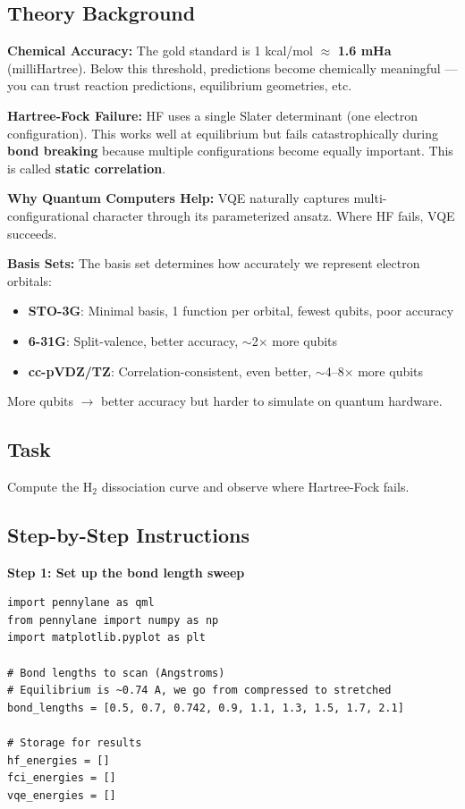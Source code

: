 \documentclass[11pt,a4paper]{article}
\begin{document}
\subsection*{Theory Background}
\textbf{Chemical Accuracy:} The gold standard is 1 kcal/mol $\approx$ \textbf{1.6 mHa} (milliHartree). Below this threshold, predictions become chemically meaningful --- you can trust reaction predictions, equilibrium geometries, etc.

\textbf{Hartree-Fock Failure:} HF uses a single Slater determinant (one electron configuration). This works well at equilibrium but fails catastrophically during \textbf{bond breaking} because multiple configurations become equally important. This is called \textbf{static correlation}.

\textbf{Why Quantum Computers Help:} VQE naturally captures multi-configurational character through its parameterized ansatz. Where HF fails, VQE succeeds.

\textbf{Basis Sets:} The basis set determines how accurately we represent electron orbitals:
\begin{itemize}
    \item \textbf{STO-3G}: Minimal basis, 1 function per orbital, fewest qubits, poor accuracy
    \item \textbf{6-31G}: Split-valence, better accuracy, $\sim$2$\times$ more qubits
    \item \textbf{cc-pVDZ/TZ}: Correlation-consistent, even better, $\sim$4--8$\times$ more qubits
\end{itemize}
More qubits $\to$ better accuracy but harder to simulate on quantum hardware.

\subsection*{Task}
Compute the H$_2$ dissociation curve and observe where Hartree-Fock fails.

\subsection*{Step-by-Step Instructions}

\textbf{Step 1: Set up the bond length sweep}
\begin{lstlisting}
import pennylane as qml
from pennylane import numpy as np
import matplotlib.pyplot as plt

# Bond lengths to scan (Angstroms)
# Equilibrium is ~0.74 A, we go from compressed to stretched
bond_lengths = [0.5, 0.7, 0.742, 0.9, 1.1, 1.3, 1.5, 1.7, 2.1]

# Storage for results
hf_energies = []
fci_energies = []
vqe_energies = []
\end{lstlisting}
\end{document}
